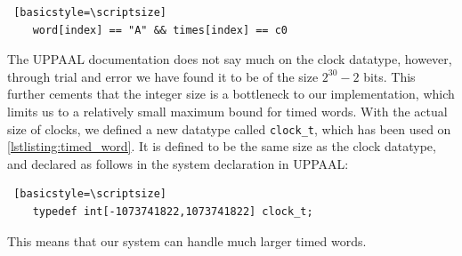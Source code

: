 \begin{lstlisting} [basicstyle=\scriptsize]
    word[index] == "A" && times[index] == c0
\end{lstlisting}

The UPPAAL documentation does not say much on the clock datatype, however, through trial and error we have found it to be of the size $2^{30}-2$ bits.
This further cements that the integer size is a bottleneck to our implementation, which limits us to a relatively small maximum bound for timed words.
With the actual size of clocks, we defined a new datatype called \verb|clock_t|, which has been used on \cref{lstlisting:timed_word}. It is defined to be the same size as the clock datatype, and declared as follows in the system declaration in UPPAAL:

\begin{lstlisting} [basicstyle=\scriptsize]
    typedef int[-1073741822,1073741822] clock_t;
\end{lstlisting}

This means that our system can handle much larger timed words.

